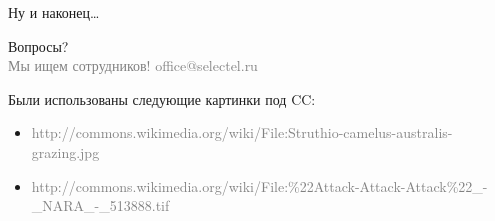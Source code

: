 \documentclass[10pt]{beamer}
\newcommand{\light}[1]{\textcolor{gray}{\footnotesize{#1}}}
\begin{document}
\begin{frame}{Ну и наконец…}
  \begin{center}
    \huge Вопросы?\\
    \light{Мы ищем сотрудников! office@selectel.ru}
  \end{center}
\end{frame}

\begin{frame}{}
  Были использованы следующие картинки под CC:
  \begin{itemize}
  \item \light{http://commons.wikimedia.org/wiki/File:Struthio-camelus-australis-grazing.jpg}
  \item \light{http://commons.wikimedia.org/wiki/File:\%22Attack-Attack-Attack\%22\_-\_NARA\_-\_513888.tif}
  \end{itemize}
\end{frame}
\end{document}
